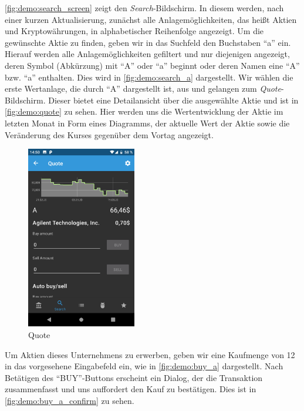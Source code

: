 \documentclass[a4paper]{article}
\begin{document}
\autoref{fig:demo:search_screen} zeigt den \textit{Search}-Bildschirm.
In diesem werden, nach einer kurzen Aktualisierung, zunächst alle Anlagemöglichkeiten, das heißt Aktien und Kryptowährungen, in alphabetischer Reihenfolge angezeigt.
Um die gewünschte Aktie zu finden, geben wir in das Suchfeld den Buchstaben "`a"' ein.
Hierauf werden alle Anlagemöglichkeiten gefiltert und nur diejenigen angezeigt, deren Symbol (Abkürzung) mit "`A"' oder "`a"' beginnt oder deren Namen eine "`A"' bzw. "`a"' enthalten.
Dies wird in \autoref{fig:demo:search_a} dargestellt.
Wir wählen die erste Wertanlage, die durch "`A"' dargestellt ist, aus und gelangen zum \textit{Quote}-Bildschirm.
Dieser bietet eine Detailansicht über die ausgewählte Aktie und ist in \autoref{fig:demo:quote} zu sehen.
Hier werden uns die Wertentwicklung der Aktie im letzten Monat in Form eines Diagramms, der aktuelle Wert der Aktie sowie die Veränderung des Kurses gegenüber dem Vortag angezeigt.

\begin{figure}[H]
	\centering
	\includegraphics[height=8cm,keepaspectratio]{./images/demo/quote.png}
	\caption{Quote}
	\label{fig:demo:quote}
\end{figure}

Um Aktien dieses Unternehmens zu erwerben, geben wir eine Kaufmenge von 12 in das vorgesehene Eingabefeld ein, wie in \autoref{fig:demo:buy_a} dargestellt.
Nach Betätigen des "`BUY"'-Buttons erscheint ein Dialog, der die Transaktion zusammenfasst und uns auffordert den Kauf zu bestätigen.
Dies ist in \autoref{fig:demo:buy_a_confirm} zu sehen.
\end{document}
